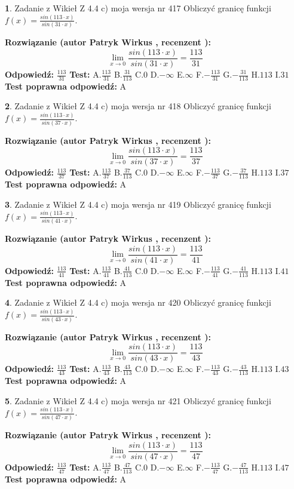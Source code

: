 \documentclass[12pt, a4paper]{article}
\theoremstyle{definition} %
\newtheorem{zad}{}
\newcommand{\zadStart}[1]{\begin{zad}#1\newline}
\newcommand{\zadStop}{\end{zad}}
\newcommand{\rozwStart}[2]{\noindent \textbf{Rozwiązanie (autor #1 , recenzent #2): }\newline}
\newcommand{\rozwStop}{\newline}
\newcommand{\odpStart}{\noindent \textbf{Odpowiedź:}\newline}
\newcommand{\odpStop}{\newline}
\newcommand{\testStart}{\noindent \textbf{Test:}\newline}
\newcommand{\testStop}{\newline}
\newcommand{\kluczStart}{\noindent \textbf{Test poprawna odpowiedź:}\newline}
\newcommand{\kluczStop}{\newline}
\begin{document}
\zadStart{Zadanie z Wikieł Z 4.4 c) moja wersja nr 417}
Obliczyć granicę funkcji $f(x)=\frac{sin(113\cdot x)}{sin(31\cdot x)}$.
\zadStop
\rozwStart{Patryk Wirkus}{}
$$\lim\limits_{x\to 0}\frac{sin(113\cdot x)}{sin(31\cdot x)}=
\frac{113}{31}$$
\rozwStop
\odpStart
$\frac{113}{31}$
\odpStop
\testStart
A.$\frac{113}{31}$
B.$\frac{31}{113}$
C.$0$
D.$-\infty$
E.$\infty$
F.$-\frac{113}{31}$
G.$-\frac{31}{113}$
H.$113$
I.$31$
\testStop
\kluczStart
A
\kluczStop



\zadStart{Zadanie z Wikieł Z 4.4 c) moja wersja nr 418}
Obliczyć granicę funkcji $f(x)=\frac{sin(113\cdot x)}{sin(37\cdot x)}$.
\zadStop
\rozwStart{Patryk Wirkus}{}
$$\lim\limits_{x\to 0}\frac{sin(113\cdot x)}{sin(37\cdot x)}=
\frac{113}{37}$$
\rozwStop
\odpStart
$\frac{113}{37}$
\odpStop
\testStart
A.$\frac{113}{37}$
B.$\frac{37}{113}$
C.$0$
D.$-\infty$
E.$\infty$
F.$-\frac{113}{37}$
G.$-\frac{37}{113}$
H.$113$
I.$37$
\testStop
\kluczStart
A
\kluczStop



\zadStart{Zadanie z Wikieł Z 4.4 c) moja wersja nr 419}
Obliczyć granicę funkcji $f(x)=\frac{sin(113\cdot x)}{sin(41\cdot x)}$.
\zadStop
\rozwStart{Patryk Wirkus}{}
$$\lim\limits_{x\to 0}\frac{sin(113\cdot x)}{sin(41\cdot x)}=
\frac{113}{41}$$
\rozwStop
\odpStart
$\frac{113}{41}$
\odpStop
\testStart
A.$\frac{113}{41}$
B.$\frac{41}{113}$
C.$0$
D.$-\infty$
E.$\infty$
F.$-\frac{113}{41}$
G.$-\frac{41}{113}$
H.$113$
I.$41$
\testStop
\kluczStart
A
\kluczStop



\zadStart{Zadanie z Wikieł Z 4.4 c) moja wersja nr 420}
Obliczyć granicę funkcji $f(x)=\frac{sin(113\cdot x)}{sin(43\cdot x)}$.
\zadStop
\rozwStart{Patryk Wirkus}{}
$$\lim\limits_{x\to 0}\frac{sin(113\cdot x)}{sin(43\cdot x)}=
\frac{113}{43}$$
\rozwStop
\odpStart
$\frac{113}{43}$
\odpStop
\testStart
A.$\frac{113}{43}$
B.$\frac{43}{113}$
C.$0$
D.$-\infty$
E.$\infty$
F.$-\frac{113}{43}$
G.$-\frac{43}{113}$
H.$113$
I.$43$
\testStop
\kluczStart
A
\kluczStop



\zadStart{Zadanie z Wikieł Z 4.4 c) moja wersja nr 421}
Obliczyć granicę funkcji $f(x)=\frac{sin(113\cdot x)}{sin(47\cdot x)}$.
\zadStop
\rozwStart{Patryk Wirkus}{}
$$\lim\limits_{x\to 0}\frac{sin(113\cdot x)}{sin(47\cdot x)}=
\frac{113}{47}$$
\rozwStop
\odpStart
$\frac{113}{47}$
\odpStop
\testStart
A.$\frac{113}{47}$
B.$\frac{47}{113}$
C.$0$
D.$-\infty$
E.$\infty$
F.$-\frac{113}{47}$
G.$-\frac{47}{113}$
H.$113$
I.$47$
\testStop
\kluczStart
A
\kluczStop
\end{document}
